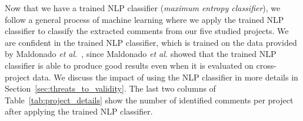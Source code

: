Now that we have a trained NLP classifier (\textit{maximum entropy classifier}), we follow a general process of machine learning where we apply the trained NLP classifier to classify the extracted comments from our five studied projects. We are confident in the trained NLP classifier, which is trained on the data provided by Maldonado \emph{et al.}~\cite{Maldonado2015TSE}, since Maldonado \emph{et al.} showed that the trained NLP classifier is able to produce good results even when it is evaluated on cross-project data. We discuss the impact of using the NLP classifier in more details in Section~\ref{sec:threats_to_validity}. The last two columns of Table~\ref{tab:project_details} show the number of identified \SATD comments per project after applying the trained NLP classifier.
